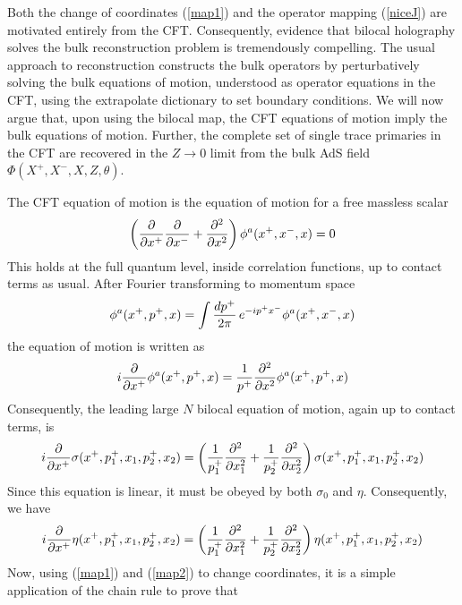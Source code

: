 \documentclass[a4paper,12pt]{article}
\begin{document}
Both the change of coordinates (\ref{map1}) and the operator mapping (\ref{niceJ}) are motivated entirely from the CFT.
Consequently, evidence that bilocal holography solves the bulk reconstruction problem is tremendously compelling.
The usual approach to reconstruction \cite{Banks:1998dd,Bena:1999jv,Hamilton:2006az}
constructs the bulk operators by perturbatively solving the bulk equations of motion, understood as operator equations in the
CFT, using the extrapolate dictionary \cite{Harlow:2011ke} to set boundary conditions.
We will now argue that, upon using the bilocal map, the CFT equations of motion imply the bulk equations of motion.
Further, the complete set of single trace primaries in the CFT are recovered in the $Z\to 0$ limit from the bulk AdS field
$\Phi(X^+,X^-,X,Z,\theta)$. 

The CFT equation of motion is the equation of motion for a free massless scalar
% 
\begin{equation}
\left({\partial\over\partial x^+}{\partial\over\partial x^-}+{\partial^2\over\partial x^2}\right)\phi^a(x^+,x^-,x)=0
\end{equation}
%
This holds at the full quantum level, inside correlation functions, up to contact terms as usual.
After Fourier transforming to momentum space
%
\begin{equation}
\phi^a(x^+,p^+,x)=\int {dp^+\over 2\pi}\, e^{-ip^+x^-}\phi^a(x^+,x^-,x)
\end{equation}
%
the equation of motion is written as
%
\begin{equation}
i{\partial\over\partial x^+}\phi^a(x^+,p^+,x)={1\over p^+}{\partial^2\over\partial x^2}\phi^a(x^+,p^+,x)
\label{ffeom}
\end{equation}
%
Consequently, the leading large $N$ bilocal equation of motion, again up to contact terms, is
%
\begin{equation}
i{\partial\over\partial x^+}\sigma(x^+,p_1^+,x_1,p_2^+,x_2)=
\left({1\over p_1^+}{\partial^2\over\partial x_1^2}+{1\over p^+_2}{\partial^2\over\partial x_2^2}\right)
\sigma(x^+,p_1^+,x_1,p_2^+,x_2)
\end{equation}
%
Since this equation is linear, it must be obeyed by both $\sigma_0$ and $\eta$.
Consequently, we have
%
\begin{equation}
i{\partial\over\partial x^+}\eta(x^+,p_1^+,x_1,p_2^+,x_2)=
\left({1\over p_1^+}{\partial^2\over\partial x_1^2}+{1\over p^+_2}{\partial^2\over\partial x_2^2}\right)
\eta(x^+,p_1^+,x_1,p_2^+,x_2)\label{bilocaleom}
\end{equation}
%
Now, using (\ref{map1}) and (\ref{map2}) to change coordinates, it is a simple application of the chain rule to prove that
\end{document}
